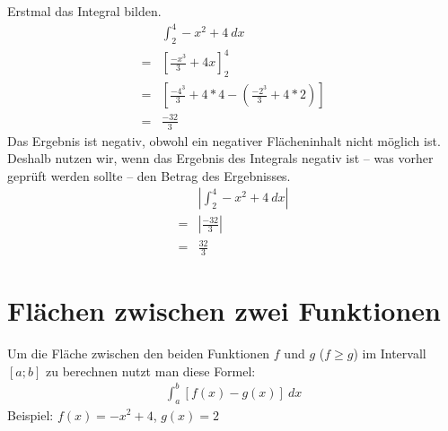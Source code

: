 \begin{flushleft}
    Erstmal das Integral bilden.
    \begin{align}
        &\int_{2}^{4} -x^2+4 \ dx \\
        = &\left[\frac{-x^3}{3}+4x\right]_{2}^{4} \\
        = &\left[\frac{-4^3}{3}+4*4-\left(\frac{-2^3}{3}+4*2\right)\right] \\
        = &\frac{-32}{3}
    \end{align}
    Das Ergebnis ist negativ, obwohl ein negativer Flächeninhalt nicht möglich ist.
    Deshalb nutzen wir, wenn das Ergebnis des Integrals negativ ist -- was vorher geprüft werden sollte -- den Betrag des Ergebnisses.
    \begin{align}
        & \left | \int_{2}^{4} -x^2+4 \ dx \right | \\
        = & \left | \frac{-32}{3} \right | \\
        = &\frac{32}{3}
    \end{align}
\end{flushleft}

\section{Flächen zwischen zwei Funktionen}

\begin{flushleft}
    Um die Fläche zwischen den beiden Funktionen $f$ und $g$ ($f \geq g$) im Intervall $[a;b]$ zu berechnen nutzt man diese Formel:
    \begin{align}
        \int_{a}^{b} \left[f(x)-g(x)\right] \ dx
    \end{align}
    Beispiel: $f(x)=-x^2+4$, $g(x)=2$
\end{flushleft}

\begin{center}
\end{center}

